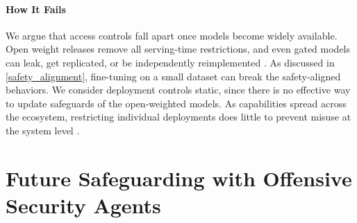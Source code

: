 \documentclass{article}
\theoremstyle{plain}
\theoremstyle{definition}
\theoremstyle{remark}
\begin{document}
\paragraph{How It Fails}
We argue that access controls fall apart once models become widely available. Open weight releases remove all serving-time restrictions, and even gated models can leak, get replicated, or be independently reimplemented \citep{rigaki2023survey,liang2024model}. As discussed in \autoref{safety_alignment}, fine-tuning on a small dataset can break the safety-aligned behaviors. We consider deployment controls static, since there is no effective way to update safeguards of the open-weighted models. As capabilities spread across the ecosystem, restricting individual deployments does little to prevent misuse at the system level \citep{bengio2024managing}.





\section{Future Safeguarding with Offensive Security Agents}
\label{sec:4}




\begin{table}[!h]
\caption{Performance of SOTA agents on widely used security benchmarks. The numbers are higher, the better.}
\centering
{}
\label{tab:capability_dataset_performance}
\end{table}
\end{document}
